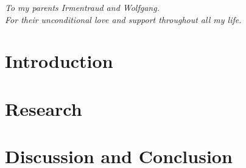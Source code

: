 \documentclass[oneside]{book}
\begin{document}



\clearpage
\begin{center}
    \thispagestyle{empty}
    \vspace*{\fill}
    \textit{To my parents Irmentraud and Wolfgang. \\ For their unconditional love and support throughout all my life.}
    \vspace*{\fill}
\end{center}

\clearpage


\epigraphhead[450]{}
\part{Introduction}
\label{part:introduction}




\epigraphhead[450]{}
\part{Research}
\label{part:research}





\epigraphhead[450]{}
\part{Discussion and Conclusion}
\label{part:discussion}




\renewcommand\bibname{References}



\end{document}
